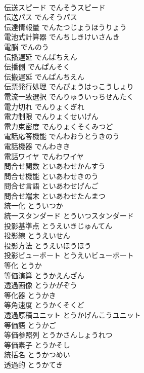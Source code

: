 \documentclass[8pt]{extreport}
\begin{document}
\begin{CJK}{UTF8}{min}
\\	伝送スピード	でんそうスピード	
\\	伝送パス	でんそうパス	
\\	伝達情報量	でんたつじょうほうりょう	
\\	電池式計算器	でんちしきけいさんき	
\\	電脳	でんのう	
\\	伝播遅延	でんぱちえん	
\\	伝播側	でんぱんそく	
\\	伝搬遅延	でんぱんちえん	
\\	伝票発行処理	でんぴょうはっこうしょり	
\\	電流一致選択	でんりゅういっちせんたく	
\\	電力切れ	でんりょくぎれ	
\\	電力制限	でんりょくせいげん	
\\	電力束密度	でんりょくそくみつど	
\\	電話応答機能	でんわおうとうきのう	
\\	電話機器	でんわきき	
\\	電話ワイヤ	でんわワイヤ	
\\	問合せ関数	といあわせかんすう	
\\	問合せ機能	といあわせきのう	
\\	問合せ言語	といあわせげんご	
\\	問合せ端末	といあわせたんまつ	
\\	統一化	とういつか	
\\	統一スタンダード	とういつスタンダード	
\\	投影基準点	とうえいきじゅんてん	
\\	投影線	とうえいせん	
\\	投影方法	とうえいほうほう	
\\	投影ビューポート	とうえいビューポート	
\\	等化	とうか	
\\	等価演算	とうかえんざん	
\\	透過画像	とうかがぞう	
\\	等化器	とうかき	
\\	等角速度	とうかくそくど	
\\	透過原稿ユニット	とうかげんこうユニット	
\\	等価語	とうかご	
\\	等価参照列	とうかさんしょうれつ	
\\	等価素子	とうかそし	
\\	統括名	とうかつめい	
\\	透過的	とうかてき	

\end{CJK}
\end{document}
